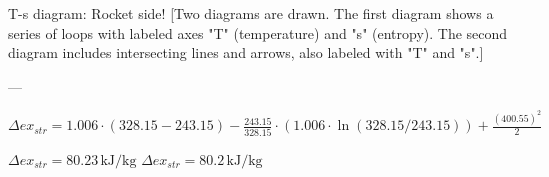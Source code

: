 T-s diagram: Rocket side!  
[Two diagrams are drawn. The first diagram shows a series of loops with labeled axes "T" (temperature) and "s" (entropy). The second diagram includes intersecting lines and arrows, also labeled with "T" and "s".]

---

\( \Delta ex_{str} = 1.006 \cdot (328.15 - 243.15) - \frac{243.15}{328.15} \cdot (1.006 \cdot \ln(328.15 / 243.15)) + \frac{(400.55)^2}{2} \)  

\( \Delta ex_{str} = 80.23 \, \text{kJ/kg} \)  
\( \Delta ex_{str} = 80.2 \, \text{kJ/kg} \)